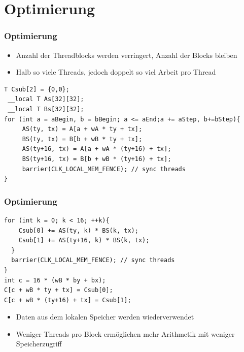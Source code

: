 \documentclass{beamer}
\begin{document}
\section{Optimierung}
\begin{frame}[fragile]
\frametitle{Optimierung}

\begin{itemize}
\item
Anzahl der Threadblocks werden verringert, Anzahl der Blocks bleiben 
\item
Halb so viele Threads, jedoch doppelt so viel Arbeit pro Thread
\end{itemize}


\begin{lstlisting}[style=customc,caption=Optimized Code in OpenCL]
T Csub[2] = {0,0};
 __local T As[32][32]; 
 __local T Bs[32][32]; 
for (int a = aBegin, b = bBegin; a <= aEnd;a += aStep, b+=bStep){ 
     AS(ty, tx) = A[a + wA * ty + tx]; 
     BS(ty, tx) = B[b + wB * ty + tx]; 
     AS(ty+16, tx) = A[a + wA * (ty+16) + tx]; 
     BS(ty+16, tx) = B[b + wB * (ty+16) + tx]; 
     barrier(CLK_LOCAL_MEM_FENCE); // sync threads
}
\end{lstlisting}



\end{frame}


\begin{frame}[fragile]
\frametitle{Optimierung}
\begin{lstlisting}[style=customc,caption=innere Schleife und Output]
  for (int k = 0; k < 16; ++k){ 
    Csub[0] += AS(ty, k) * BS(k, tx); 
    Csub[1] += AS(ty+16, k) * BS(k, tx); 
  } 
  barrier(CLK_LOCAL_MEM_FENCE); // sync threads
} 
int c = 16 * (wB * by + bx);
C[c + wB * ty + tx] = Csub[0]; 
C[c + wB * (ty+16) + tx] = Csub[1]; 
\end{lstlisting}

\begin{itemize}

\item
Daten aus dem lokalen Speicher werden wiederverwendet
\item 
Weniger Threads pro Block erm\"oglichen mehr Arithmetik mit weniger Speicherzugriff
\end{itemize}


\end{frame}
\end{document}

